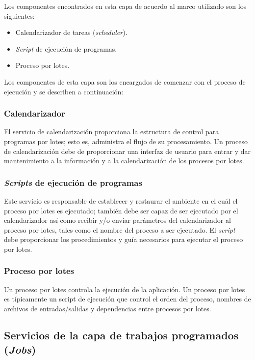 Los componentes encontrados en esta capa de acuerdo al marco utilizado son los
siguientes:

\begin{itemize}
\item Calendarizador de tareas (\emph{scheduler}).
\item \emph{Script} de ejecución de programas.
\item Proceso por lotes.
\end{itemize}

Los componentes de esta capa son los encargados de comenzar con el proceso de
ejecución y se describen a continuación:

\subsubsection{Calendarizador}

El servicio de calendarización proporciona la estructura de control para
programas por lotes; esto es, administra el flujo de su procesamiento. Un
proceso de calendarización debe de proporcionar una interfaz de usuario para
entrar y dar mantenimiento a la información y a la calendarización de los
procesos por lotes.

\subsubsection{\emph{Scripts} de ejecución de programas}

Este servicio es responsable de establecer y restaurar el ambiente en el cuál el
proceso por lotes es ejecutado; también debe ser capaz de ser ejecutado por el
calendarizador así como recibir y/o enviar parámetros del calendarizador al
proceso por lotes, tales como el nombre del proceso a ser ejecutado. El
\emph{script} debe proporcionar los procedimientos y guía necesarios para
ejecutar el proceso por lotes.

\subsubsection{Proceso por lotes}

Un proceso por lotes controla la ejecución de la aplicación. Un proceso por
lotes es típicamente un script de ejecución que control el orden del proceso,
nombres de archivos de entradas/salidas y dependencias entre procesos por lotes.

\subsection{Servicios de la capa de trabajos programados (\emph{Jobs})}

